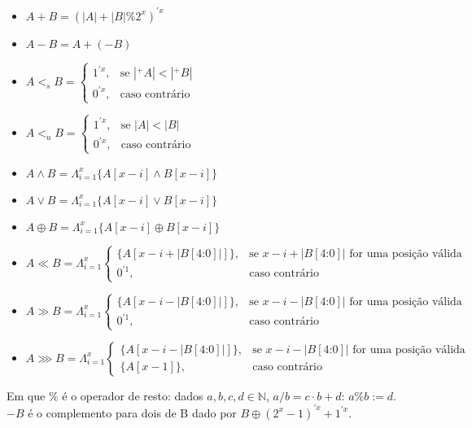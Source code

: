 \begin{itemize}
  \item $ A + B = (|A|+|B| \% 2^x)^{'x}  $
  \item $ A - B = A + (-B) $
  \item $ A <_s B = \begin{cases}
          1^{'x}, & \text{se } |^+A| < |^+B| \\
          0^{'x}, & \text{caso contrário}
          \end{cases}$

  \item $ A <_u B = \begin{cases}
          1^{'x}, & \text{se } |A| < |B| \\
          0^{'x}, & \text{caso contrário}
          \end{cases}$

  \item $ A \land B = \Lambda_{i=1}^x \{A[x-i] \land B[x-i]\} $
  \item $ A \lor B = \Lambda_{i=1}^x \{A[x-i] \lor B[x-i]\} $
  \item $ A \oplus B = \Lambda_{i=1}^x \{A[x-i] \oplus B[x-i]\} $
  \item $ A \ll B = \Lambda_{i=1}^{x} \begin{cases}
          \{A[x-i+|B[4\text{:}0]|]\}, & \text{se } x-i+|B[4\text{:}0]| \text{ for uma posição válida } \\
          0^{'1}, & \text{caso contrário}
          \end{cases}$ \\
  \item $ A \gg B = \Lambda_{i=1}^{x} \begin{cases}
          \{A[x-i-|B[4\text{:}0]|]\}, & \text{se } x-i-|B[4\text{:}0]| \text{ for uma posição válida } \\
          0^{'1}, & \text{caso contrário}
          \end{cases}$ \\
  \item $ A \ggg B = \Lambda_{i=1}^{x} \begin{cases}
          \{A[x-i-|B[4\text{:}0]|]\}, & \text{se } x-i-|B[4\text{:}0]| \text{ for uma posição válida } \\
          \{A[x-1]\}, & \text{caso contrário}
          \end{cases}$ \\
\end{itemize}

  Em que $\%$ é o operador de resto: dados $a, b, c, d \in \mathbb{N} $, $a / b = c \cdot b + d $: $a\%b := d$.
  $-B$ é o complemento para dois de B dado por $ B \oplus (2^x-1)^{'x} + 1^{'x}$.

